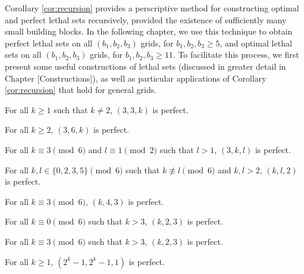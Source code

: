 Corollary \ref{cor:recursion} provides a perscriptive method for constructing optimal and perfect lethal sets recursively, provided the existence of sufficiently many small building blocks. In the following chapter, we use this technique to obtain perfect lethal sets on all $(b_1,b_2,b_3)$ grids, for $b_1,b_2,b_3 \geq 5$, and optimal lethal sets on all $(b_1,b_2,b_3)$ grids, for $b_1,b_2,b_3 \geq 11$. To facilitate this process, we first present some useful constructions of lethal sets (discussed in greater detail in Chapter [Constructions]), as well as particular applications of Corollary \ref{cor:recursion} that hold for general grids. 

\begin{prop}
\label{prop:3x3xk}
For all $k \geq 1$ such that $k \neq 2$, $(3,3,k)$ is perfect.
\end{prop}

\begin{prop}
\label{prop:3x6xk}
For all $k \geq 2$, $(3,6,k)$ is perfect.
\end{prop}

\begin{prop}
\label{prop:thickness_3_2d_family}
For all $k \equiv 3 \pmod 6$ and $l \equiv 1 \pmod 2$ such that $l >1$, $(3,k,l)$ is perfect.
\end{prop}

\begin{prop}
\label{prop:thickness_2_2d_family}
For all $k,l \in \{0,2,3,5\} \pmod 6$ such that $k \not\equiv l \pmod 6$ and $k,l > 2$, $(k,l,2)$ is perfect.
\end{prop}

\begin{prop}
\label{prop:thickness_3_width_4}
For all $k \equiv 3 \pmod 6$, $(k,4,3)$ is perfect.
\end{prop}

\begin{prop}
\label{prop:2x3xk_0}
For all $k \equiv 0 \pmod 6$ such that $k>3$, $(k,2,3)$ is perfect.
\end{prop}

\begin{prop}
\label{prop:2x3xk_3}
For all $k \equiv 3 \pmod 6$ such that $k>3$, $(k,2,3)$ is perfect.
\end{prop}

\begin{prop}
\label{prop:purina}
For all $k \geq 1$, $(2^k-1,2^k-1,1)$ is perfect.
\end{prop}

